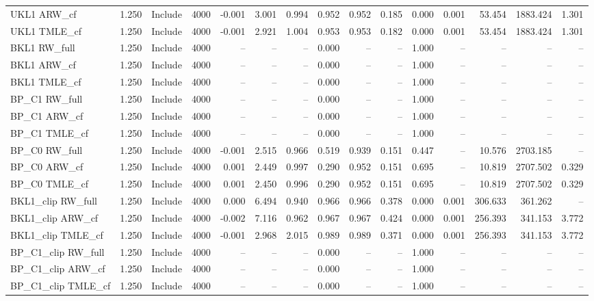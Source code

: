 \begin{tabular}{llllrrrrrrrrrrr}
UKL1 ARW\_cf & 1.250 & Include & 4000 & -0.001 & 3.001 & 0.994 & 0.952 & 0.952 & 0.185 & 0.000 & 0.001 & 53.454 & 1883.424 & 1.301 \\
UKL1 TMLE\_cf & 1.250 & Include & 4000 & -0.001 & 2.921 & 1.004 & 0.953 & 0.953 & 0.182 & 0.000 & 0.001 & 53.454 & 1883.424 & 1.301 \\
BKL1 RW\_full & 1.250 & Include & 4000 & -- & -- & -- & 0.000 & -- & -- & 1.000 & -- & -- & -- & -- \\
BKL1 ARW\_cf & 1.250 & Include & 4000 & -- & -- & -- & 0.000 & -- & -- & 1.000 & -- & -- & -- & -- \\
BKL1 TMLE\_cf & 1.250 & Include & 4000 & -- & -- & -- & 0.000 & -- & -- & 1.000 & -- & -- & -- & -- \\
BP\_C1 RW\_full & 1.250 & Include & 4000 & -- & -- & -- & 0.000 & -- & -- & 1.000 & -- & -- & -- & -- \\
BP\_C1 ARW\_cf & 1.250 & Include & 4000 & -- & -- & -- & 0.000 & -- & -- & 1.000 & -- & -- & -- & -- \\
BP\_C1 TMLE\_cf & 1.250 & Include & 4000 & -- & -- & -- & 0.000 & -- & -- & 1.000 & -- & -- & -- & -- \\
BP\_C0 RW\_full & 1.250 & Include & 4000 & -0.001 & 2.515 & 0.966 & 0.519 & 0.939 & 0.151 & 0.447 & -- & 10.576 & 2703.185 & -- \\
BP\_C0 ARW\_cf & 1.250 & Include & 4000 & 0.001 & 2.449 & 0.997 & 0.290 & 0.952 & 0.151 & 0.695 & -- & 10.819 & 2707.502 & 0.329 \\
BP\_C0 TMLE\_cf & 1.250 & Include & 4000 & 0.001 & 2.450 & 0.996 & 0.290 & 0.952 & 0.151 & 0.695 & -- & 10.819 & 2707.502 & 0.329 \\
BKL1\_clip RW\_full & 1.250 & Include & 4000 & 0.000 & 6.494 & 0.940 & 0.966 & 0.966 & 0.378 & 0.000 & 0.001 & 306.633 & 361.262 & -- \\
BKL1\_clip ARW\_cf & 1.250 & Include & 4000 & -0.002 & 7.116 & 0.962 & 0.967 & 0.967 & 0.424 & 0.000 & 0.001 & 256.393 & 341.153 & 3.772 \\
BKL1\_clip TMLE\_cf & 1.250 & Include & 4000 & -0.001 & 2.968 & 2.015 & 0.989 & 0.989 & 0.371 & 0.000 & 0.001 & 256.393 & 341.153 & 3.772 \\
BP\_C1\_clip RW\_full & 1.250 & Include & 4000 & -- & -- & -- & 0.000 & -- & -- & 1.000 & -- & -- & -- & -- \\
BP\_C1\_clip ARW\_cf & 1.250 & Include & 4000 & -- & -- & -- & 0.000 & -- & -- & 1.000 & -- & -- & -- & -- \\
BP\_C1\_clip TMLE\_cf & 1.250 & Include & 4000 & -- & -- & -- & 0.000 & -- & -- & 1.000 & -- & -- & -- & -- \\

\end{tabular}
